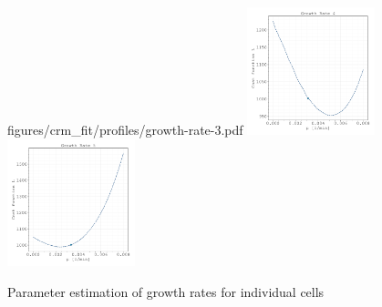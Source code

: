 \documentclass{article}
\begin{document}
\begin{figure}[H]
        {figures/crm_fit/profiles/growth-rate-3.pdf}%
    \includegraphics[width=0.33\textwidth]
        {figures/crm_fit/profiles/growth-rate-4.pdf}%
    \includegraphics[width=0.33\textwidth]
        {figures/crm_fit/profiles/growth-rate-5.pdf}
    \caption{Parameter estimation of growth rates for individual cells}%
    \label{fig:parameter-estimates-supplement-growth-rates}
\end{figure}
\end{document}
